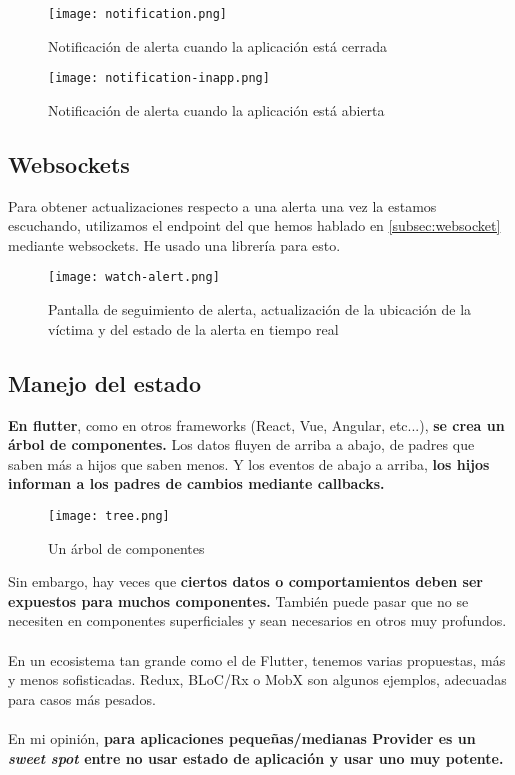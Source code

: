 \begin{figure}[H]
	\centering	
	\texttt{[image: notification.png]}
	\caption{Notificación de alerta cuando la aplicación está cerrada}
	\end{figure}

\begin{figure}[H]
	\centering	
	\texttt{[image: notification-inapp.png]}
	\caption{Notificación de alerta cuando la aplicación está abierta}
	\end{figure}

\subsection{Websockets}

Para obtener actualizaciones respecto a una alerta una vez la estamos escuchando, utilizamos el endpoint del que hemos hablado en \ref{subsec:websocket} mediante websockets.
He usado una librería \cite{websocketchannel} para esto.

\begin{figure}[H]
	\centering	
	\texttt{[image: watch-alert.png]}
	\caption{Pantalla de seguimiento de alerta, actualización de la ubicación de la víctima y del estado de la alerta en tiempo real}
	\end{figure}

\subsection{Manejo del estado}
\textbf{En flutter}, como en otros frameworks (React, Vue, Angular, etc...), \textbf{se crea un árbol de componentes.}
Los datos fluyen de arriba a abajo, de padres que saben más a hijos que saben
menos. Y los eventos de abajo a arriba, \textbf{los hijos informan a los padres de cambios mediante callbacks.}
\begin{figure}[H]
	\centering	
	\texttt{[image: tree.png]}
	\caption{Un árbol de componentes}
	\end{figure}
Sin embargo, hay veces que \textbf{ciertos datos o comportamientos deben ser
expuestos para muchos componentes.} También puede pasar que no se necesiten
en componentes superficiales y sean necesarios en otros muy profundos. \\ \\
En un ecosistema tan grande como el de Flutter, tenemos varias propuestas, más y
menos sofisticadas. Redux, BLoC/Rx o MobX son algunos ejemplos, adecuadas
para casos más pesados.\\ \\
En mi opinión, \textbf{para aplicaciones pequeñas/medianas Provider es un \textit{sweet spot}
entre no usar estado de aplicación y usar uno muy potente.} \\ \\

